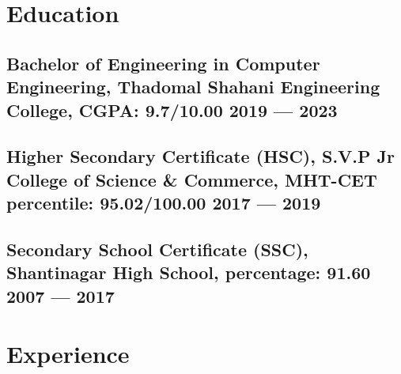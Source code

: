 \documentclass[a4,10pt]{article}
\newcommand{\subtext}[1]{
#1\par\vspace{-0.2cm}}
\newcommand{\hskills}[1]{
\textbf{\bfseries #1} }
\begin{document}


\section{Education }
\subsection*{Bachelor of Engineering in Computer Engineering, {\normalsize \normalfont Thadomal Shahani Engineering College, CGPA: \textbf{9.7}/10.00} \hfill 2019 --- 2023} 
\vspace{0.1cm}
\subsection*{Higher Secondary Certificate (HSC), {\normalsize \normalfont S.V.P Jr College of Science \& Commerce, MHT-CET percentile: 95.02/100.00} \hfill 2017 --- 2019} 
\vspace{0.1cm}
\subsection*{Secondary School Certificate (SSC), {\normalsize \normalfont Shantinagar High School, percentage: 91.60} \hfill 2007 --- 2017} 
\vspace{0.2cm}


\section{Experience}
\end{document}
